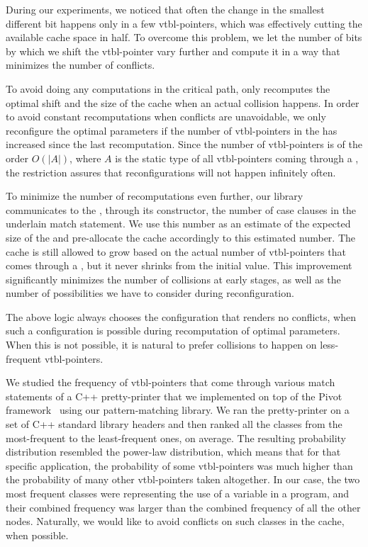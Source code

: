 During our experiments, we noticed that often the change in the smallest 
different bit happens only in a few vtbl-pointers, which was effectively 
cutting the available cache space in half. To overcome this problem, we let the 
number of bits by which we shift the vtbl-pointer vary further and compute it in 
a way that minimizes the number of conflicts.

To avoid doing any computations in the critical path,  only 
recomputes the optimal shift and the size of the cache when an actual collision 
happens. In order to avoid constant recomputations when conflicts are unavoidable, 
we only reconfigure the optimal parameters if 
the number of vtbl-pointers in the  has increased since the last 
recomputation. Since the number of vtbl-pointers is of the order $O(|A|)$, where 
$A$ is the static type of all vtbl-pointers coming through a , the 
restriction assures that reconfigurations will not happen infinitely often.

To minimize the number of recomputations even further, our library communicates 
to the , through its constructor, the number of case clauses in 
the underlain match statement. We use this number as an estimate of the expected 
size of the  and pre-allocate the cache accordingly to this estimated 
number. The cache is still allowed to grow based on the actual number of 
vtbl-pointers that comes through a , but it never shrinks from the
initial value. This improvement significantly minimizes the number of collisions 
at early stages, as well as the number of possibilities we have to consider 
during reconfiguration.

The above logic always chooses the configuration that renders 
no conflicts, when such a configuration is possible during recomputation of 
optimal parameters. When this is not possible, it is natural to prefer collisions 
to happen on less-frequent vtbl-pointers.

We studied the frequency of vtbl-pointers that come through various match statements
of a C++ pretty-printer that we implemented on top of the Pivot 
framework~\cite{Pivot09} using our pattern-matching library. We ran the 
pretty-printer on a set of C++ standard library headers and then ranked all the  
classes from the most-frequent to the least-frequent ones, on average. The 
resulting probability distribution resembled the power-law distribution, which means 
that for that specific application, the probability of some vtbl-pointers was much 
higher than the probability of many other vtbl-pointers taken altogether. In 
our case, the two most frequent classes were representing the use of a variable in 
a program, and their combined frequency was larger than the combined frequency 
of all the other nodes. Naturally, we would like to avoid conflicts on such 
classes in the cache, when possible.

